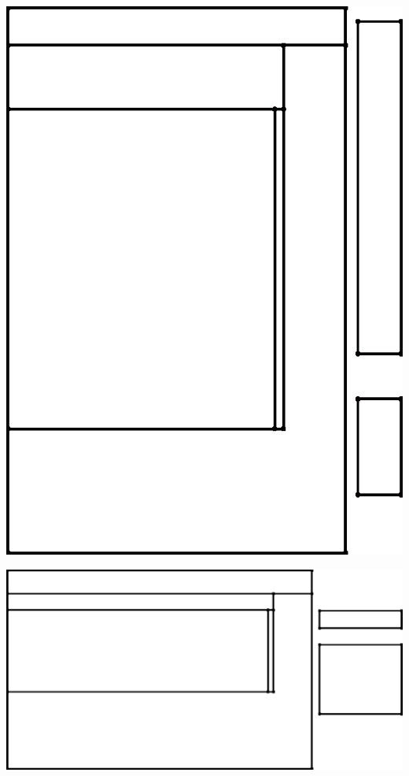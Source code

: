 \documentclass[portrait, a1paper, fontscale=0.5]{baposter}
\begin{document}
\begin{poster}
{\begin{center}
\begin{minipage}{8em}
		\includegraphics[scale=0.125]{optimization/variant_3.png}
	\end{minipage}
	\begin{minipage}{10em}
		\centering
		\includegraphics[scale=0.105]{optimization/variant_4.png}
	\end{minipage}
\end{center}

}
\end{poster}
\end{document}
